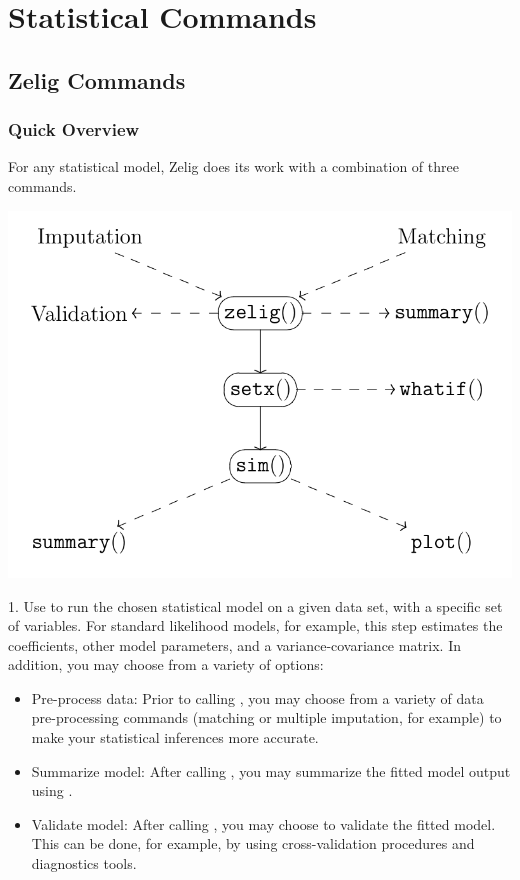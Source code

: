 \documentclass[letterpaper,10pt,english]{sphinxmanual}
\begin{document}
\chapter{Statistical Commands}
\label{4_statistical_commands:statistical-commands}\label{4_statistical_commands::doc}

\section{Zelig Commands}
\label{4_statistical_commands:zelig-commands}

\subsection{Quick Overview}
\label{4_statistical_commands:quick-overview}
For any statistical model, Zelig does its work with a combination of three commands.

\includegraphics{main_commands.png}

1. Use  to run the chosen statistical model on a given data set, with a specific
set of variables. For standard likelihood models, for example, this step estimates the
coefficients, other model parameters, and a variance-covariance matrix. In addition,
you may choose from a variety of options:
\begin{itemize}
\item {} 
Pre-process data: Prior to calling , you may choose from a variety of
data pre-processing commands (matching or multiple imputation, for example)
to make your statistical inferences more accurate.

\item {} 
Summarize model: After calling , you may summarize the fitted model
output using .

\item {} 
Validate model: After calling , you may choose to validate the fitted model.
This can be done, for example, by using cross-validation procedures and diagnostics tools.

\end{itemize}
\end{document}

